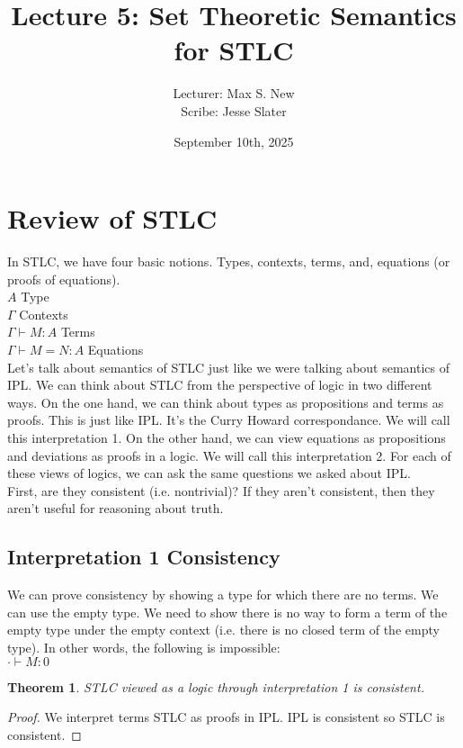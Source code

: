 \documentclass[12pt]{article}
\newtheorem{theorem}{Theorem}
\begin{document}
\title{Lecture 5: Set Theoretic Semantics for STLC}
\author{Lecturer: Max S. New\\ Scribe: Jesse Slater}
\date{September 10th, 2025}
\maketitle

\section{Review of STLC}
In STLC, we have four basic notions. Types, contexts, terms, and, equations (or proofs of equations). \\
$A$ Type\\
$\Gamma$ Contexts\\
$\Gamma \vdash M : A$ Terms\\
$\Gamma \vdash M = N : A$ Equations\\

Let's talk about semantics of STLC just like we were talking about semantics of IPL. We can think about STLC from the perspective of logic in two different ways. On the one hand, we can think about types as propositions and terms as proofs. This is just like IPL. It's the Curry Howard correspondance. We will call this interpretation 1. On the other hand, we can view equations as propositions and deviations as proofs in a logic. We will call this interpretation 2. For each of these views of logics, we can ask the same questions we asked about IPL. \\

First, are they consistent (i.e. nontrivial)? If they aren't consistent, then they aren't useful for reasoning about truth. \\

\subsection{Interpretation 1 Consistency}
We can prove consistency by showing a type for which there are no terms. We can use the empty type. We need to show there is no way to form a term of the empty type under the empty context (i.e. there is no closed term of the empty type). In other words, the following is impossible: \\
$\cdot \vdash M : 0$ \\
\begin{theorem} STLC viewed as a logic through interpretation 1 is consistent.
\end{theorem}
\begin{proof} We interpret terms STLC as proofs in IPL. IPL is consistent so STLC is consistent.
\end{proof}
\end{document}
